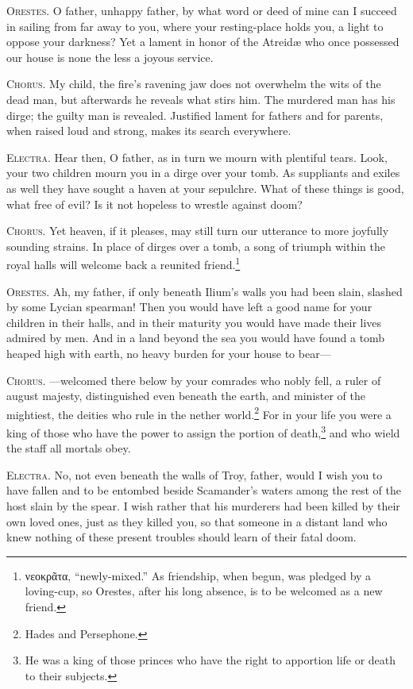 \documentclass[12pt]{article}
\begin{document}
\textsc{Orestes.} O father, unhappy father, by what word or deed of mine can I succeed in sailing from far away to you, where your resting-place holds you, a light to oppose your darkness? Yet a lament in honor of the Atreid{\ae} who once possessed our house is none the less a joyous service.

\textsc{Chorus.} My child, the fire's ravening jaw does not overwhelm the wits of the dead man, but afterwards he reveals what stirs him. The murdered man has his dirge; the guilty man is revealed. Justified lament for fathers and for parents, when raised loud and strong, makes its search everywhere.

\textsc{Electra.} Hear then, O father, as in turn we mourn with plentiful tears. Look, your two children mourn you in a dirge over your tomb. As suppliants and exiles as well they have sought a haven at your sepulchre. What of these things is good, what free of evil? Is it not hopeless to wrestle against doom?

\textsc{Chorus.} Yet heaven, if it pleases, may still turn our utterance to more joyfully sounding strains. In place of dirges over a tomb, a song of triumph within the royal halls will welcome back a reunited friend.\footnote{νεοκρᾶτα, ``newly-mixed.'' As friendship, when begun, was pledged by a loving-cup, so Orestes, after his long absence, is to be welcomed as a new friend.}

\textsc{Orestes.} Ah, my father, if only beneath Ilium's walls you had been slain, slashed by some Lycian spearman! Then you would have left a good name for your children in their halls, and in their maturity you would have made their lives admired by men. And in a land beyond the sea you would have found a tomb heaped high with earth, no heavy burden for your house to bear---

\textsc{Chorus.} ---welcomed there below by your comrades who nobly fell, a ruler of august majesty, distinguished even beneath the earth, and minister of the mightiest, the deities who rule in the nether world.\footnote{Hades and Persephone.} For in your life you were a king of those who have the power to assign the portion of death,\footnote{He was a king of those princes who have the right to apportion life or death to their subjects.} and who wield the staff all mortals obey.

\textsc{Electra.} No, not even beneath the walls of Troy, father, would I wish you to have fallen and to be entombed beside Scamander's waters among the rest of the host slain by the spear. I wish rather that his murderers had been killed by their own loved ones, just as they killed you, so that someone in a distant land who knew nothing of these present troubles should learn of their fatal doom.
\end{document}
